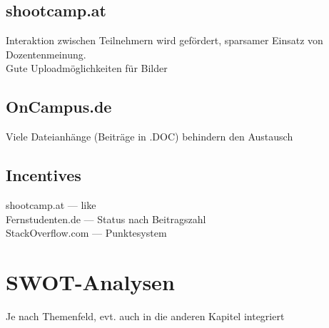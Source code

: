 \subsection{shootcamp.at} %
\label{sub:shootcamp_at}
Interaktion zwischen Teilnehmern wird gefördert, sparsamer Einsatz von Dozentenmeinung.\\
Gute Uploadmöglichkeiten für Bilder

\subsection{OnCampus.de} %
\label{sub:oncampus_de}
Viele Dateianhänge (Beiträge in .DOC) behindern den Austausch

\subsection{Incentives} %
\label{sub:infentives}
shootcamp.at --- like\\
Fernstudenten.de --- Status nach Beitragszahl\\
StackOverflow.com --- Punktesystem


\section{SWOT-Analysen} %
\label{sec:swot_analysen}
Je nach  Themenfeld, evt. auch in die anderen Kapitel integriert
